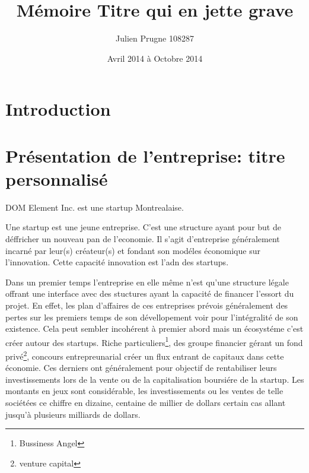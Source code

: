 \documentclass[11pt, a4paper ]{article}
\title{Mémoire Titre qui en jette grave}
\author{Julien Prugne 108287}
\date{Avril 2014 à Octobre 2014}
\let\stdsection\section
\renewcommand\section{\newpage\stdsection}
\begin{document}
\begin{spacing}{1.5}

	\maketitle
	\tableofcontents


	\section{Introduction} %



	\section{Présentation de l'entreprise: titre personnalisé} %

DOM Element Inc. est une startup Montrealaise.

Une startup\cite{theseStartup} est une jeune entreprise. C'est une structure ayant pour but de déffricher un nouveau pan de l'economie. Il s'agit d'entreprise généralement incarné par leur(s) créateur(s) et fondant son modéles économique sur l'innovation. Cette capacité innovation est l'adn des startups.

Dans un premier temps l'entreprise en elle même n'est qu'une structure légale offrant une interface avec des stuctures ayant la capacité de financer l'essort du projet. En effet, les plan d'affaires de ces entreprises prévois généralement des pertes sur les premiers temps de son dévellopement voir pour l'intégralité de son existence. Cela peut sembler incohérent à premier abord mais un écosystéme c'est créer autour des startups. Riche particuliers\footnote{Bussiness Angel}, des groupe financier gérant un fond privé\footnote{venture capital}, concours entrepreunarial créer un flux entrant de capitaux dans cette économie. Ces derniers ont généralement pour objectif de rentabiliser leurs investissements lors de la vente ou de la capitalisation boursiére de la startup. Les montants en jeux sont considérable, les investissements ou les ventes de telle sociétées ce chiffre en dizaine, centaine de millier de dollars certain cas allant jusqu'à plusieurs milliards de dollars.


\end{spacing}
\end{document}
